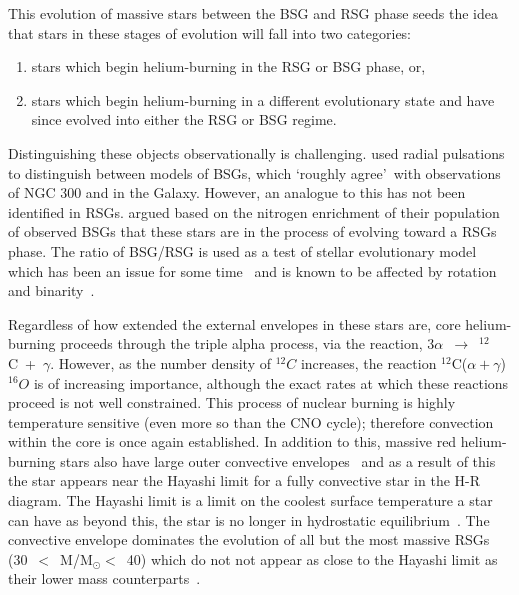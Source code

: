 This evolution of massive stars between the BSG and RSG phase seeds the idea that stars in these stages of evolution will fall into two categories:

\begin{enumerate}
    \item stars which begin helium-burning in the RSG or BSG phase, or,
    \item stars which begin helium-burning in a different evolutionary state and have since evolved into either the RSG or BSG regime.
\end{enumerate}

Distinguishing these objects observationally is challenging.
\cite{Saio13} used radial pulsations to distinguish between models of BSGs, which \textquoteleft roughly agree\textquoteright ~with observations of NGC 300 and in the Galaxy.
However, an analogue to this has not been identified in RSGs.
\cite{2012A&A...542A..79C} argued based on the nitrogen enrichment of their population of observed BSGs that these stars are in the process of evolving toward a RSGs phase.
The ratio of BSG/RSG is used as a test of stellar evolutionary model which has been an issue for some time~\citep{1995A&A...295..685L} and is known to be affected by rotation~\citep{2001A&A...373..555M,2012A&A...537A.146E} and binarity~\citep{2008MNRAS.384.1109E}.


Regardless of how extended the external envelopes in these stars are, core helium-burning proceeds through the triple alpha process, via the reaction, 3$\alpha$~$\rightarrow$~$^{12}$C~+~$\gamma$.
However, as the number density of $^{12}C$ increases, the reaction $^{12}$C($\alpha+\gamma$)$^{16}O$ is of increasing importance, although the exact rates at which these reactions proceed is not well constrained.
This process of nuclear burning is highly temperature sensitive (even more so than the CNO cycle); therefore convection within the core is once again established.
In addition to this, massive red helium-burning stars also have large outer convective envelopes~\citep{2012sse..book.....K} and as a result of this the star appears near the Hayashi limit for a fully convective star in the H-R diagram.
The Hayashi limit is a limit on the coolest surface temperature a star can have as beyond this, the star is no longer in hydrostatic equilibrium~\citep{1961PASJ...13..442H}.
The convective envelope dominates the evolution of all but the most massive RSGs (30~$<$~M/M$_{\odot}<$~40) which do not not appear as close to the Hayashi limit as their lower mass counterparts~\citep[see Figure 1 in][]{Saio13}.

